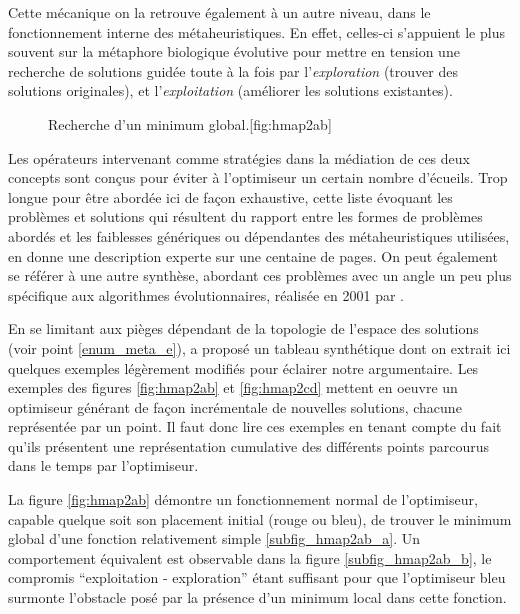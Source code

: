 Cette mécanique on la retrouve également à un autre niveau, dans le fonctionnement interne des métaheuristiques. En effet, celles-ci s'appuient le plus souvent sur la métaphore biologique évolutive pour mettre en tension une recherche de solutions guidée toute à la fois par l'\textit{exploration} (trouver des solutions originales), et l'\textit{exploitation} (améliorer les solutions existantes). 

\begin{figure}[!htbp]
\begin{sidecaption}[fortoc]{Recherche d'un minimum global.}[fig:hmap2ab]
 \centering
 \qquad
\end{sidecaption}
\end{figure}

Les opérateurs intervenant comme stratégies dans la médiation de ces deux concepts sont conçus pour éviter à l'optimiseur un certain nombre d'écueils. Trop longue pour être abordée ici de façon exhaustive, cette liste évoquant les problèmes et solutions qui résultent du rapport entre les formes de problèmes abordés et les faiblesses génériques ou dépendantes des métaheuristiques utilisées, \textcite{Weise2011} en donne une description experte sur une centaine de pages. On peut également se référer à une autre synthèse, abordant ces problèmes avec un angle un peu plus spécifique aux algorithmes évolutionnaires, réalisée en 2001 par \textcite[316-445]{Deb2001}.

En se limitant aux pièges dépendant de la topologie de l'espace des solutions (voir point \ref{enum_meta_e}), \textcite[140]{Weise2011} a proposé un tableau synthétique dont on extrait ici quelques exemples légèrement modifiés pour éclairer notre argumentaire. Les exemples des figures \ref{fig:hmap2ab} et \ref{fig:hmap2cd} mettent en oeuvre un optimiseur générant de façon incrémentale de nouvelles solutions, chacune représentée par un point. Il faut donc lire ces exemples en tenant compte du fait qu'ils présentent une représentation cumulative des différents points parcourus dans le temps par l'optimiseur.

La figure \ref{fig:hmap2ab} démontre un fonctionnement normal de l'optimiseur, capable quelque soit son placement initial (rouge ou bleu), de trouver le minimum global d'une fonction relativement simple \ref{subfig_hmap2ab_a}. Un comportement équivalent est observable dans la figure \ref{subfig_hmap2ab_b}, le compromis \enquote{exploitation - exploration} étant suffisant pour que l'optimiseur bleu surmonte l'obstacle posé par la présence d'un minimum local dans cette fonction.

